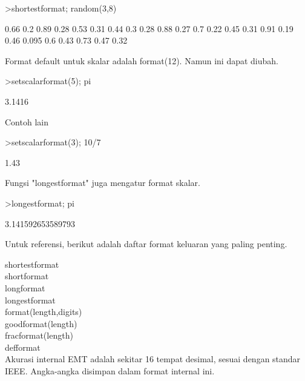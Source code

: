 \documentclass[a4paper,10pt]{article}
\begin{document}
\begin{eulernotebook}
\begin{eulerprompt}
>shortestformat; random(3,8)
\end{eulerprompt}
\begin{euleroutput}
    0.66    0.2   0.89   0.28   0.53   0.31   0.44    0.3 
    0.28   0.88   0.27    0.7   0.22   0.45   0.31   0.91 
    0.19   0.46  0.095    0.6   0.43   0.73   0.47   0.32 
\end{euleroutput}
\begin{eulercomment}
Format default untuk skalar adalah format(12). Namun ini dapat diubah.
\end{eulercomment}
\begin{eulerprompt}
>setscalarformat(5); pi
\end{eulerprompt}
\begin{euleroutput}
  3.1416
\end{euleroutput}
\begin{eulercomment}
Contoh lain
\end{eulercomment}
\begin{eulerprompt}
>setscalarformat(3); 10/7
\end{eulerprompt}
\begin{euleroutput}
  1.43
\end{euleroutput}
\begin{eulercomment}
Fungsi "longestformat" juga mengatur format skalar.
\end{eulercomment}
\begin{eulerprompt}
>longestformat; pi
\end{eulerprompt}
\begin{euleroutput}
  3.141592653589793
\end{euleroutput}
\begin{eulercomment}
Untuk referensi, berikut adalah daftar format keluaran yang paling
penting.

shortestformat\\
shortformat\\
longformat\\
longestformat\\
format(length,digits)\\
goodformat(length)\\
fracformat(length)\\
defformat\\
Akurasi internal EMT adalah sekitar 16 tempat desimal, sesuai dengan
standar IEEE. Angka-angka disimpan dalam format internal ini.


\end{eulercomment}
\end{eulernotebook}
\end{document}
